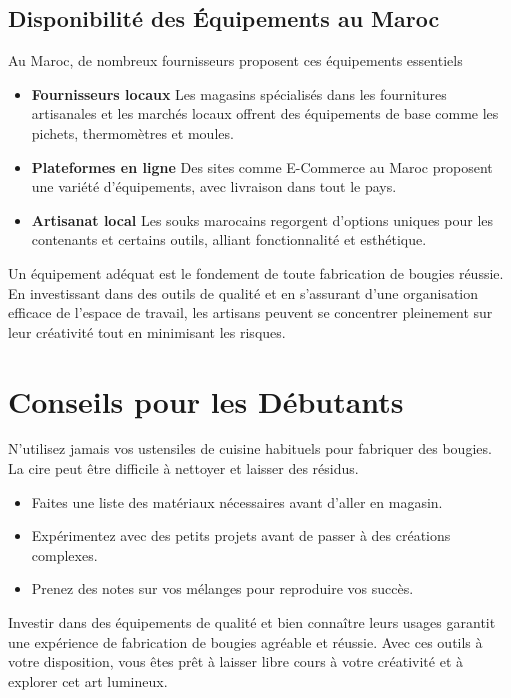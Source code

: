 \documentclass[11pt,fleqn,onecolumn,oneside]{book}
\begin{document}
\subsection*{Disponibilité des Équipements au Maroc}

Au Maroc, de nombreux fournisseurs proposent ces équipements essentiels
\begin{itemize}
    \item \textbf{Fournisseurs locaux} Les magasins spécialisés dans les fournitures artisanales et les marchés locaux offrent des équipements de base comme les pichets, thermomètres et moules.
    \item \textbf{Plateformes en ligne} Des sites comme E-Commerce au Maroc proposent une variété d’équipements, avec livraison dans tout le pays.
    \item \textbf{Artisanat local} Les souks marocains regorgent d’options uniques pour les contenants et certains outils, alliant fonctionnalité et esthétique.
\end{itemize}

\begin{remark}
Un équipement adéquat est le fondement de toute fabrication de bougies réussie. En investissant dans des outils de qualité et en s’assurant d’une organisation efficace de l’espace de travail, les artisans peuvent se concentrer pleinement sur leur créativité tout en minimisant les risques. 
\end{remark}

\section{Conseils pour les Débutants}

\begin{remark}
N’utilisez jamais vos ustensiles de cuisine habituels pour fabriquer des bougies. La cire peut être difficile à nettoyer et laisser des résidus.
\end{remark}

\begin{itemize}
    \item Faites une liste des matériaux nécessaires avant d’aller en magasin.
    \item Expérimentez avec des petits projets avant de passer à des créations complexes.
    \item Prenez des notes sur vos mélanges pour reproduire vos succès.
\end{itemize}

\begin{corollary}
Investir dans des équipements de qualité et bien connaître leurs usages garantit une expérience de fabrication de bougies agréable et réussie. Avec ces outils à votre disposition, vous êtes prêt à laisser libre cours à votre créativité et à explorer cet art lumineux.
\end{corollary}
\end{document}

